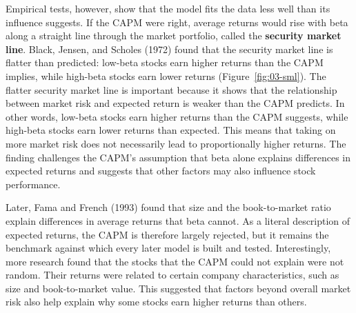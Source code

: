 Empirical tests, however, show that the model fits the data less well than its influence suggests. If the CAPM were right, average returns would rise with beta along a straight line through the market portfolio, called the \textbf{security market line}. Black, Jensen, and Scholes (1972) found that the security market line is flatter than predicted: low-beta stocks earn higher returns than the CAPM implies, while high-beta stocks earn lower returns (Figure~\ref{fig:03-sml}). 
The flatter security market line is important because it shows that the relationship between market risk and expected return is weaker than the CAPM predicts. In other words, low-beta stocks earn higher returns than the CAPM suggests, while high-beta stocks earn lower returns than expected. This means that taking on more market risk does not necessarily lead to proportionally higher returns. The finding challenges the CAPM's assumption that beta alone explains differences in expected returns and suggests that other factors may also influence stock performance. 

Later, Fama and French (1993) found that size and the book-to-market ratio explain differences in average returns that beta cannot. As a literal description of expected returns, the CAPM is therefore largely rejected, but it remains the benchmark against which every later model is built and tested. 
Interestingly, more research found that the stocks that the CAPM could not explain were not random. Their returns were related to certain company characteristics, such as size and book-to-market value. This suggested that factors beyond overall market risk also help explain why some stocks earn higher returns than others.




